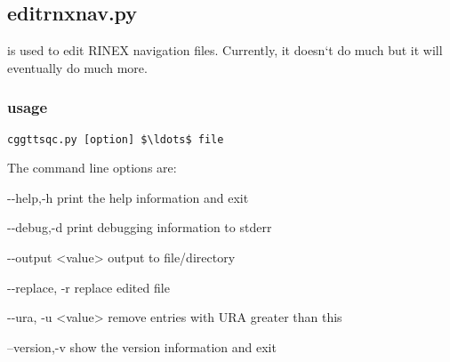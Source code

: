 \subsection{editrnxnav.py}

\hypertarget{h:editrnxnav}{}

 is used to edit RINEX navigation files. Currently, it doesn`t do much
but it will eventually do much more. 

\subsubsection{usage}

\begin{lstlisting}[mathescape=true]
cggttsqc.py [option] $\ldots$ file 
\end{lstlisting}
The command line options are:
\begin{description*}
	\item[-{}-help,-h]	print the help information and exit
	\item[-{}-debug,-d]	print debugging information to stderr
	\item[-{}-output \textless{value}\textgreater] output to file/directory
  \item[-{}-replace, -r]         replace edited file
  \item[-{}-ura, -u \textless{value}\textgreater]     remove entries with URA greater than this
	\item[--version,-v] show the version information and exit
\end{description*}

